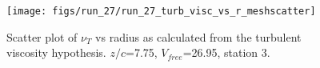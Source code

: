 \begin{figure}[H]
\centering
\texttt{[image: figs/run\_27/run\_27\_turb\_visc\_vs\_r\_meshscatter]}
\caption{Scatter plot of $\nu_T$ vs radius as calculated from the turbulent viscosity hypothesis. $z/c$=7.75, $V_{free}$=26.95, station 3.}
\label{fig:run_27_turb_visc_vs_r_meshscatter}
\end{figure}


